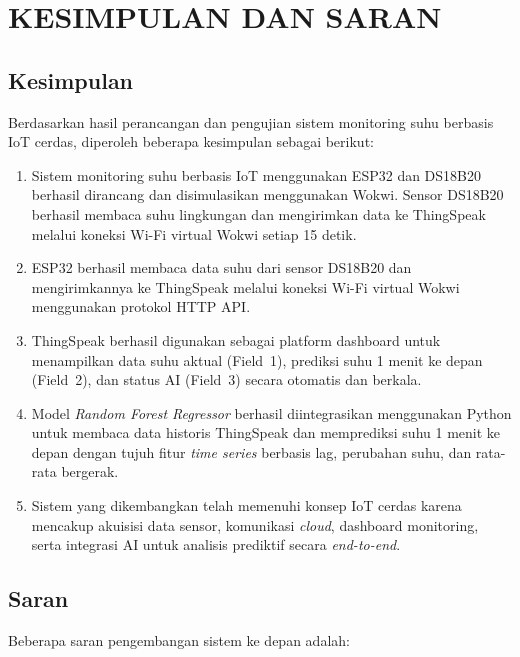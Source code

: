 \chapter{KESIMPULAN DAN SARAN}

\section{Kesimpulan}

Berdasarkan hasil perancangan dan pengujian sistem monitoring suhu berbasis
IoT cerdas, diperoleh beberapa kesimpulan sebagai berikut:

\begin{enumerate}
    \item Sistem monitoring suhu berbasis IoT menggunakan ESP32 dan
    DS18B20 berhasil dirancang dan disimulasikan menggunakan Wokwi. Sensor
    DS18B20 berhasil membaca suhu lingkungan dan mengirimkan data ke
    ThingSpeak melalui koneksi Wi-Fi virtual Wokwi setiap 15 detik.
    \item ESP32 berhasil membaca data suhu dari sensor DS18B20 dan
    mengirimkannya ke ThingSpeak melalui koneksi Wi-Fi virtual Wokwi
    menggunakan protokol HTTP API.
    \item ThingSpeak berhasil digunakan sebagai platform dashboard untuk
    menampilkan data suhu aktual (Field~1), prediksi suhu 1 menit ke depan
    (Field~2), dan status AI (Field~3) secara otomatis dan berkala.
    \item Model \textit{Random Forest Regressor} berhasil diintegrasikan
    menggunakan Python untuk membaca data historis ThingSpeak dan memprediksi
    suhu 1 menit ke depan dengan tujuh fitur \textit{time series} berbasis lag,
    perubahan suhu, dan rata-rata bergerak.
    \item Sistem yang dikembangkan telah memenuhi konsep IoT cerdas karena
    mencakup akuisisi data sensor, komunikasi \textit{cloud}, dashboard
    monitoring, serta integrasi AI untuk analisis prediktif secara
    \textit{end-to-end}.
\end{enumerate}

\section{Saran}

Beberapa saran pengembangan sistem ke depan adalah:

